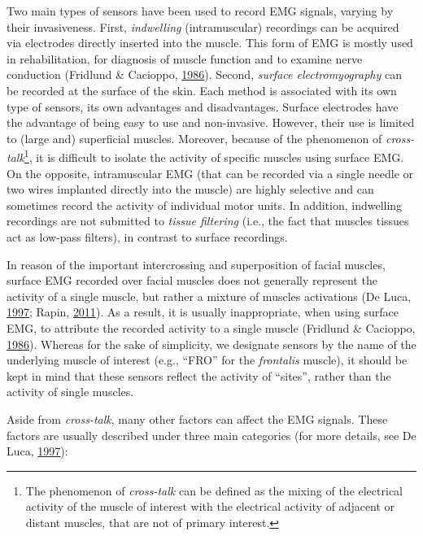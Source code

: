 \documentclass[a4paper,12pt,twoside,openright,oldfontcommands,final]{memoir}
\let\rmarkdownfootnote\footnote%
\def\footnote{\protect\rmarkdownfootnote}
\begin{document}
Two main types of sensors have been used to record EMG signals, varying by their invasiveness. First, \emph{indwelling} (intramuscular) recordings can be acquired via electrodes directly inserted into the muscle. This form of EMG is mostly used in rehabilitation, for diagnosis of muscle function and to examine nerve conduction (Fridlund \& Cacioppo, \protect\hyperlink{ref-fridlund_guidelines_1986}{1986}). Second, \emph{surface electromyography} can be recorded at the surface of the skin. Each method is associated with its own type of sensors, its own advantages and disadvantages. Surface electrodes have the advantage of being easy to use and non-invasive. However, their use is limited to (large and) superficial muscles. Moreover, because of the phenomenon of \emph{cross-talk}\footnote{The phenomenon of \emph{cross-talk} can be defined as the mixing of the electrical activity of the muscle of interest with the electrical activity of adjacent or distant muscles, that are not of primary interest.}, it is difficult to isolate the activity of specific muscles using surface EMG. On the opposite, intramuscular EMG (that can be recorded via a single needle or two wires implanted directly into the muscle) are highly selective and can sometimes record the activity of individual motor units. In addition, indwelling recordings are not submitted to \emph{tissue filtering} (i.e., the fact that muscles tissues act as low-pass filters), in contrast to surface recordings.

In reason of the important intercrossing and superposition of facial muscles, surface EMG recorded over facial muscles does not generally represent the activity of a single muscle, but rather a mixture of muscles activations (De Luca, \protect\hyperlink{ref-de_luca_use_1997}{1997}; Rapin, \protect\hyperlink{ref-Rapin2011}{2011}). As a result, it is usually inappropriate, when using surface EMG, to attribute the recorded activity to a single muscle (Fridlund \& Cacioppo, \protect\hyperlink{ref-fridlund_guidelines_1986}{1986}). Whereas for the sake of simplicity, we designate sensors by the name of the underlying muscle of interest (e.g., \enquote{FRO} for the \emph{frontalis} muscle), it should be kept in mind that these sensors reflect the activity of \enquote{sites}, rather than the activity of single muscles.

Aside from \emph{cross-talk}, many other factors can affect the EMG signals. These factors are usually described under three main categories (for more details, see De Luca, \protect\hyperlink{ref-de_luca_use_1997}{1997}):
\end{document}
